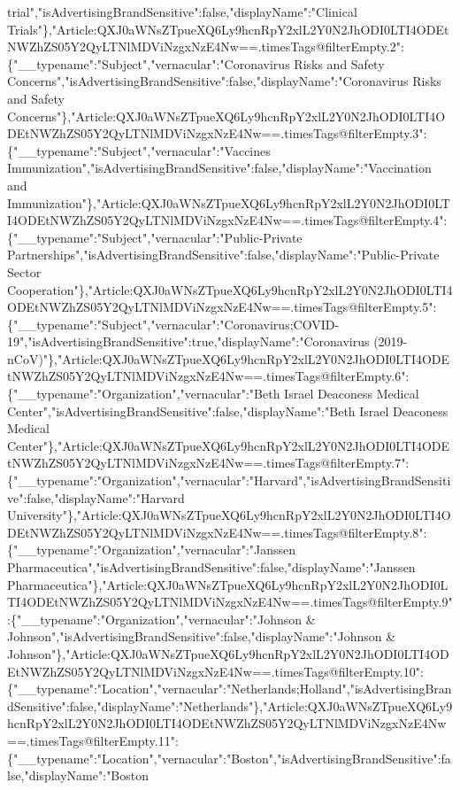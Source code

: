 trial","isAdvertisingBrandSensitive":false,"displayName":"Clinical
Trials"\},"Article:QXJ0aWNsZTpueXQ6Ly9hcnRpY2xlL2Y0N2JhODI0LTI4ODEtNWZhZS05Y2QyLTNlMDViNzgxNzE4Nw==.timesTags@filterEmpty.2":\{"\_\_typename":"Subject","vernacular":"Coronavirus
Risks and Safety
Concerns","isAdvertisingBrandSensitive":false,"displayName":"Coronavirus
Risks and Safety
Concerns"\},"Article:QXJ0aWNsZTpueXQ6Ly9hcnRpY2xlL2Y0N2JhODI0LTI4ODEtNWZhZS05Y2QyLTNlMDViNzgxNzE4Nw==.timesTags@filterEmpty.3":\{"\_\_typename":"Subject","vernacular":"Vaccines
Immunization","isAdvertisingBrandSensitive":false,"displayName":"Vaccination
and
Immunization"\},"Article:QXJ0aWNsZTpueXQ6Ly9hcnRpY2xlL2Y0N2JhODI0LTI4ODEtNWZhZS05Y2QyLTNlMDViNzgxNzE4Nw==.timesTags@filterEmpty.4":\{"\_\_typename":"Subject","vernacular":"Public-Private
Partnerships","isAdvertisingBrandSensitive":false,"displayName":"Public-Private
Sector
Cooperation"\},"Article:QXJ0aWNsZTpueXQ6Ly9hcnRpY2xlL2Y0N2JhODI0LTI4ODEtNWZhZS05Y2QyLTNlMDViNzgxNzE4Nw==.timesTags@filterEmpty.5":\{"\_\_typename":"Subject","vernacular":"Coronavirus;COVID-19","isAdvertisingBrandSensitive":true,"displayName":"Coronavirus
(2019-nCoV)"\},"Article:QXJ0aWNsZTpueXQ6Ly9hcnRpY2xlL2Y0N2JhODI0LTI4ODEtNWZhZS05Y2QyLTNlMDViNzgxNzE4Nw==.timesTags@filterEmpty.6":\{"\_\_typename":"Organization","vernacular":"Beth
Israel Deaconess Medical
Center","isAdvertisingBrandSensitive":false,"displayName":"Beth Israel
Deaconess Medical
Center"\},"Article:QXJ0aWNsZTpueXQ6Ly9hcnRpY2xlL2Y0N2JhODI0LTI4ODEtNWZhZS05Y2QyLTNlMDViNzgxNzE4Nw==.timesTags@filterEmpty.7":\{"\_\_typename":"Organization","vernacular":"Harvard","isAdvertisingBrandSensitive":false,"displayName":"Harvard
University"\},"Article:QXJ0aWNsZTpueXQ6Ly9hcnRpY2xlL2Y0N2JhODI0LTI4ODEtNWZhZS05Y2QyLTNlMDViNzgxNzE4Nw==.timesTags@filterEmpty.8":\{"\_\_typename":"Organization","vernacular":"Janssen
Pharmaceutica","isAdvertisingBrandSensitive":false,"displayName":"Janssen
Pharmaceutica"\},"Article:QXJ0aWNsZTpueXQ6Ly9hcnRpY2xlL2Y0N2JhODI0LTI4ODEtNWZhZS05Y2QyLTNlMDViNzgxNzE4Nw==.timesTags@filterEmpty.9":\{"\_\_typename":"Organization","vernacular":"Johnson
\& Johnson","isAdvertisingBrandSensitive":false,"displayName":"Johnson
\&
Johnson"\},"Article:QXJ0aWNsZTpueXQ6Ly9hcnRpY2xlL2Y0N2JhODI0LTI4ODEtNWZhZS05Y2QyLTNlMDViNzgxNzE4Nw==.timesTags@filterEmpty.10":\{"\_\_typename":"Location","vernacular":"Netherlands;Holland","isAdvertisingBrandSensitive":false,"displayName":"Netherlands"\},"Article:QXJ0aWNsZTpueXQ6Ly9hcnRpY2xlL2Y0N2JhODI0LTI4ODEtNWZhZS05Y2QyLTNlMDViNzgxNzE4Nw==.timesTags@filterEmpty.11":\{"\_\_typename":"Location","vernacular":"Boston","isAdvertisingBrandSensitive":false,"displayName":"Boston
